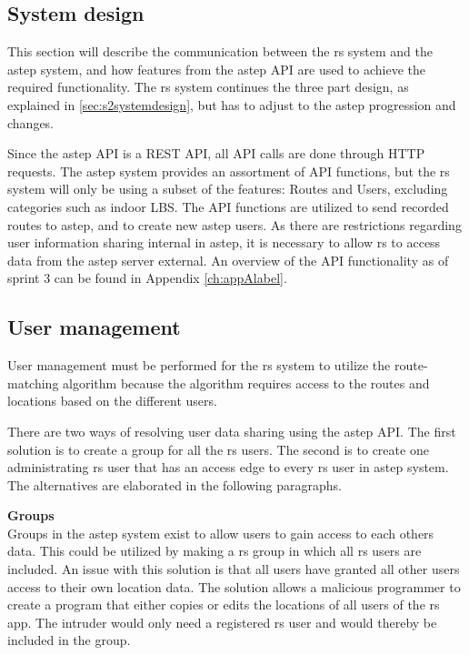 \subsection{System design}
\label{sec:aSTEPCommunication.tex}
This section will describe the communication between the \gls{rs} system and the \gls{astep} system, and how features from the \gls{astep} API are used to achieve the required functionality.
The \gls{rs} system continues the three part design, as explained in \ref{sec:s2systemdesign}, but has to adjust to the \gls{astep} progression and changes.

Since the \gls{astep} API is a REST API, all API calls are done through HTTP requests.
The \gls{astep} system provides an assortment of API functions, but the \gls{rs} system will only be using a subset of the features: Routes and Users, excluding categories such as indoor LBS.
The API functions are utilized to send recorded routes to \gls{astep}, and to create new \gls{astep} users.
As there are restrictions regarding user information sharing internal in \gls{astep}, it is necessary to allow \gls{rs} to access data from the \gls{astep} server external.
An overview of the API functionality as of sprint 3 can be found in Appendix \ref{ch:appAlabel}. 

\subsection{User management}\label{subsec:usermanagement}
User management must be performed for the \gls{rs} system to utilize the route-matching algorithm because the algorithm requires access to the routes and locations based on the different users.

There are two ways of resolving user data sharing using the \gls{astep} API.
The first solution is to create a group for all the \gls{rs} users.
The second is to create one administrating \gls{rs} user that has an access edge to every \gls{rs} user in \gls{astep} system.
The alternatives are elaborated in the following paragraphs.

\textbf{Groups}\\ 
Groups in the \gls{astep} system exist to allow users to gain access to each others data.
This could be utilized by making a \gls{rs} group in which all \gls{rs} users are included.
An issue with this solution is that all users have granted all other users access to their own location data. 
The solution allows a malicious programmer to create a program that either copies or edits the locations of all users of the \gls{rs} app.
The intruder would only need a registered \gls{rs} user and would thereby be included in the group.


